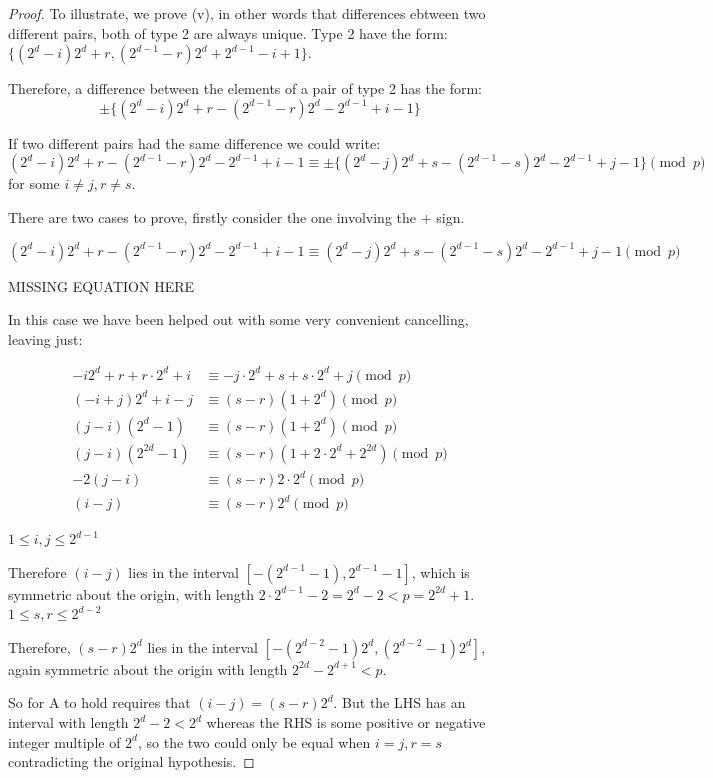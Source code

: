\documentclass[
  11pt,
  a4paper]{book}
\begin{document}
\begin{proof}
To illustrate, we prove (v), in other words that differences
ebtween two different pairs, both of type 2 are always
unique.  Type 2 have the form:
$\{(2^d - i)2^d + r, (2^{d - 1} - r)2^d + 2^{d - 1} - i + 1\}$.

Therefore, a difference
between the elements of a pair of type 2 has the form:
$$\pm \{(2^d - i)2^d + r - (2^{d - 1} - r)2^d - 2^{d - 1} + i - 1\}$$

If two different pairs had the same difference we could
write:
$$(2^d - i)2^d + r - (2^{d - 1} - r)2^d - 2^{d - 1} + i - 1 \equiv \pm \{(2^d - j)2^d + s - (2^{d - 1} - s)2^d - 2^{d - 1} + j - 1\}\pmod p$$ for some $i \neq j, r \neq s$.

There are two cases to prove, firstly consider the one
involving the + sign.

$$(2^d - i)2^d + r - (2^{d - 1} - r)2^d - 2^{d - 1} + i - 1 \equiv (2^d - j)2^d + s -(2^{d - 1} - s)2^d - 2^{d - 1} + j -1\pmod p$$

MISSING EQUATION HERE

In this case we have been helped out with some very convenient
cancelling, leaving just:

\begin{align*}
  -i2^d+r+r \cdot 2^d + i &\equiv -j \cdot 2^d + s + s \cdot 2^d + j \pmod p \\
  (-i+j)2^d + i -j &\equiv (s-r)(1+2^d)\pmod p \\ 
  (j-i)(2^d -1) &\equiv (s-r)(1+2^d)\pmod p \\
  (j-i)(2^{2d} -1) &\equiv (s-r)(1+2 \cdot 2^d + 2^{2d})\pmod p \\
  -2(j-i) &\equiv (s-r)2 \cdot 2^d\pmod p \\
  (i - j) &\equiv (s-r) 2^d \pmod p
\end{align*}

$1 \leq i, j \leq 2^{d-1}$

Therefore $(i - j)$ lies in the interval
$[-(2^{d - 1} - 1), 2^{d - 1} - 1]$,
which is symmetric about the origin, with length
$2 \cdot 2^{d - 1} - 2 = 2^d - 2 < p = 2^{2d} + 1$.
$1 \leq s,r \leq 2^{d-2}$

Therefore, $(s - r)2^d$ lies in the interval
$[-(2^{d - 2} - 1)2^d, (2^{d - 2} - 1)2^d]$,
again symmetric about the origin with length
$2^{2d} - 2^{d + 1} < p$.

So for A to hold requires that $(i - j) = (s - r)2^d$. But
the LHS has an interval with length $2^d - 2 < 2^d$ whereas
the RHS is some positive or negative integer multiple of
$2^d$, so the two could only be equal when $i = j, r = s$
contradicting the original hypothesis.


\end{proof}
\end{document}
